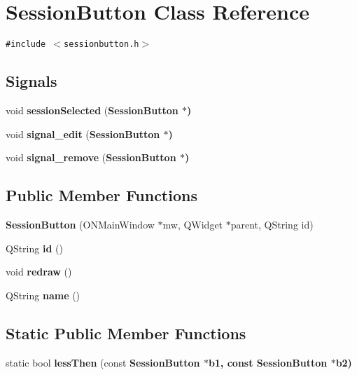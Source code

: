 \section{Session\-Button Class Reference}
\label{classSessionButton}
{\tt \#include $<$sessionbutton.h$>$}

\subsection*{Signals}
\begin{CompactItemize}
\item 
void \textbf{session\-Selected} (\bf{Session\-Button} $\ast$)\label{classSessionButton_a1b49cb51a3df82820f605640da92046}

\item 
void \textbf{signal\_\-edit} (\bf{Session\-Button} $\ast$)\label{classSessionButton_a2c43541e4e2bece2147cde0ccd35fcc}

\item 
void \textbf{signal\_\-remove} (\bf{Session\-Button} $\ast$)\label{classSessionButton_dc47b3f4adecf50610ead7caeeb15193}

\end{CompactItemize}
\subsection*{Public Member Functions}
\begin{CompactItemize}
\item 
\textbf{Session\-Button} (ONMain\-Window $\ast$mw, QWidget $\ast$parent, QString id)\label{classSessionButton_6a61509e5c9fb4c8c76ecda15289a7ba}

\item 
QString \textbf{id} ()\label{classSessionButton_c8a06dda4a58a9ab8252d96581be595f}

\item 
void \textbf{redraw} ()\label{classSessionButton_546db6e66f97df927efdebcf849e634f}

\item 
QString \textbf{name} ()\label{classSessionButton_6f4398103a27b2e60bd4f3a0fd6b73a8}

\end{CompactItemize}
\subsection*{Static Public Member Functions}
\begin{CompactItemize}
\item 
static bool \textbf{less\-Then} (const \bf{Session\-Button} $\ast$b1, const \bf{Session\-Button} $\ast$b2)\label{classSessionButton_ef53e3f3f2549c9ed828bde7555e7ba7}

\end{CompactItemize}
